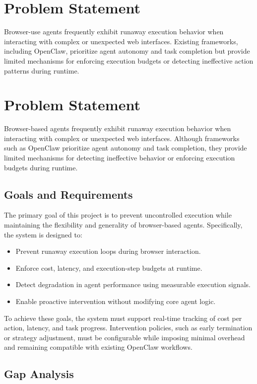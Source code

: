 \documentclass[conference]{IEEEtran}
\begin{document}
\section{Problem Statement}

Browser-use agents frequently exhibit runaway execution behavior when interacting with complex or unexpected web interfaces. Existing frameworks, including OpenClaw, prioritize agent autonomy and task completion but provide limited mechanisms for enforcing execution budgets or detecting ineffective action patterns during runtime.

\section{Problem Statement}

Browser-based agents frequently exhibit runaway execution behavior when interacting with complex or unexpected web interfaces. Although frameworks such as OpenClaw prioritize agent autonomy and task completion, they provide limited mechanisms for detecting ineffective behavior or enforcing execution budgets during runtime.

\subsection{Goals and Requirements}

The primary goal of this project is to prevent uncontrolled execution while maintaining the flexibility and generality of browser-based agents. Specifically, the system is designed to:
\begin{itemize}
    \item Prevent runaway execution loops during browser interaction.
    \item Enforce cost, latency, and execution-step budgets at runtime.
    \item Detect degradation in agent performance using measurable execution signals.
    \item Enable proactive intervention without modifying core agent logic.
\end{itemize}

To achieve these goals, the system must support real-time tracking of cost per action, latency, and task progress. Intervention policies, such as early termination or strategy adjustment, must be configurable while imposing minimal overhead and remaining compatible with existing OpenClaw workflows.

\subsection{Gap Analysis}
\end{document}
